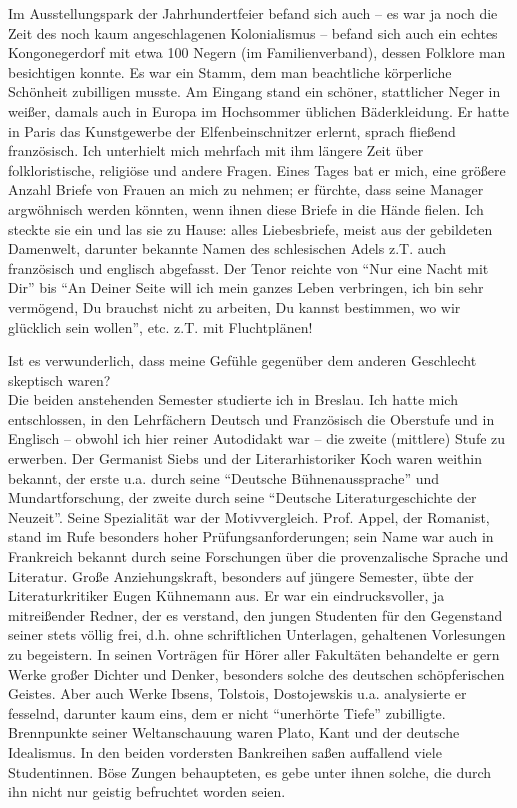 \documentclass[a5paper,pagesize,10pt,twoside=true]{scrbook}
\begin{document}
Im Ausstellungspark der Jahrhundertfeier befand sich auch -- es war ja noch die Zeit des noch kaum angeschlagenen Kolonialismus -- befand sich auch ein echtes Kongonegerdorf mit etwa 100 Negern (im Familienverband), dessen Folklore man besichtigen konnte. Es war ein Stamm, dem man beachtliche körperliche Schönheit zubilligen musste. Am Eingang stand ein schöner, stattlicher Neger in weißer, damals auch in Europa im Hochsommer üblichen Bäderkleidung. Er hatte in Paris das Kunstgewerbe der Elfenbeinschnitzer erlernt, sprach fließend französisch. Ich unterhielt mich mehrfach mit ihm längere Zeit über folkloristische, religiöse und andere Fragen. Eines Tages bat er mich, eine größere Anzahl Briefe von Frauen an mich zu nehmen; er fürchte, dass seine Manager argwöhnisch werden könnten, wenn ihnen diese Briefe in die Hände fielen. Ich steckte sie ein und las sie zu Hause: alles Liebesbriefe, meist aus der gebildeten Damenwelt, darunter bekannte Namen des schlesischen Adels z.T. auch französisch und englisch abgefasst. Der Tenor reichte von \enquote{Nur eine Nacht mit Dir} bis \enquote{An Deiner Seite will ich mein ganzes Leben verbringen, ich bin sehr vermögend, Du brauchst nicht zu arbeiten, Du kannst bestimmen, wo wir glücklich sein wollen}, etc. z.T. mit Fluchtplänen!

Ist es verwunderlich, dass meine Gefühle gegenüber dem anderen Geschlecht skeptisch waren?\\

Die beiden anstehenden Semester studierte ich in Breslau. Ich hatte mich entschlossen, in den Lehrfächern Deutsch und Französisch die Oberstufe und in Englisch -- obwohl ich hier reiner Autodidakt war -- die zweite (mittlere) Stufe zu erwerben. Der Germanist Siebs und der Literarhistoriker Koch waren weithin bekannt, der erste u.a. durch seine \enquote{Deutsche Bühnenaussprache} und Mundartforschung, der zweite durch seine \enquote{Deutsche Literaturgeschichte der Neuzeit}. Seine Spezialität war der Motivvergleich. Prof. Appel, der Romanist, stand im Rufe besonders hoher Prüfungsanforderungen; sein Name war auch in Frankreich bekannt durch seine Forschungen über die provenzalische Sprache und Literatur. Große Anziehungskraft, besonders auf jüngere Semester, übte der Literaturkritiker Eugen Kühnemann aus. Er war ein eindrucksvoller, ja mitreißender Redner, der es verstand, den jungen Studenten für den Gegenstand seiner stets völlig frei, d.h. ohne schriftlichen Unterlagen, gehaltenen Vorlesungen zu begeistern. In seinen Vorträgen für Hörer aller Fakultäten behandelte er gern Werke großer Dichter und Denker, besonders solche des deutschen schöpferischen Geistes. Aber auch Werke Ibsens, Tolstois, Dostojewskis u.a. analysierte er fesselnd, darunter kaum eins, dem er nicht \enquote{unerhörte Tiefe} zubilligte. Brennpunkte seiner Weltanschauung waren Plato, Kant und der deutsche Idealismus. In den beiden vordersten Bankreihen saßen auffallend viele Studentinnen. Böse Zungen behaupteten, es gebe unter ihnen solche, die durch ihn nicht nur geistig befruchtet worden seien.
\end{document}
